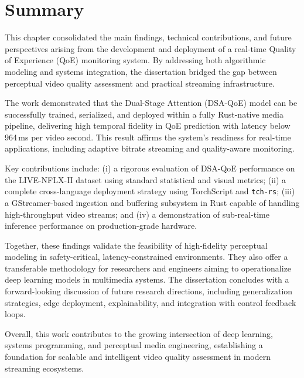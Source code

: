\section{Summary}

This chapter consolidated the main findings, technical contributions, and future perspectives arising from the development and deployment of a real-time Quality of Experience (QoE) monitoring system. By addressing both algorithmic modeling and systems integration, the dissertation bridged the gap between perceptual video quality assessment and practical streaming infrastructure.

The work demonstrated that the Dual-Stage Attention (DSA-QoE) model can be successfully trained, serialized, and deployed within a fully Rust-native media pipeline, delivering high temporal fidelity in QoE prediction with latency below 964\,ms per video second. This result affirms the system’s readiness for real-time applications, including adaptive bitrate streaming and quality-aware monitoring.

Key contributions include: (i) a rigorous evaluation of DSA-QoE performance on the LIVE-NFLX-II dataset using standard statistical and visual metrics; (ii) a complete cross-language deployment strategy using TorchScript and \texttt{tch-rs}; (iii) a GStreamer-based ingestion and buffering subsystem in Rust capable of handling high-throughput video streams; and (iv) a demonstration of sub-real-time inference performance on production-grade hardware.

Together, these findings validate the feasibility of high-fidelity perceptual modeling in safety-critical, latency-constrained environments. They also offer a transferable methodology for researchers and engineers aiming to operationalize deep learning models in multimedia systems. The dissertation concludes with a forward-looking discussion of future research directions, including generalization strategies, edge deployment, explainability, and integration with control feedback loops.

Overall, this work contributes to the growing intersection of deep learning, systems programming, and perceptual media engineering, establishing a foundation for scalable and intelligent video quality assessment in modern streaming ecosystems.
